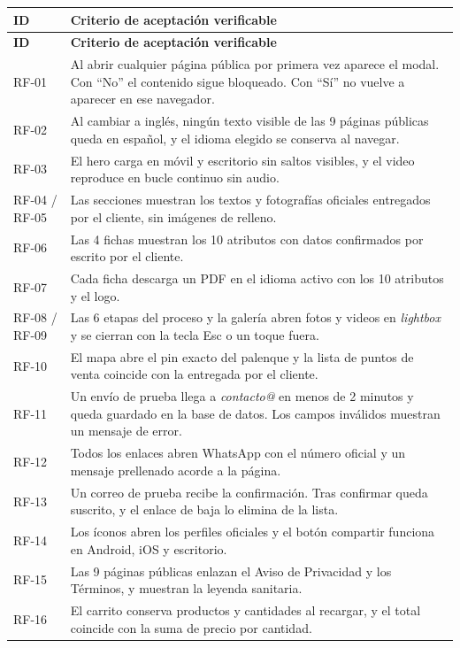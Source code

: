 \documentclass[11pt,letterpaper]{article}
\begin{document}
\renewcommand{\arraystretch}{1.3}
\small
\begin{longtable}{@{} L{1.9cm} L{13.9cm} @{}}
\toprule
\textbf{ID} & \textbf{Criterio de aceptación verificable} \\
\midrule
\endfirsthead
\toprule
\textbf{ID} & \textbf{Criterio de aceptación verificable} \\
\midrule
\endhead
\bottomrule
\endfoot
RF-01 & Al abrir cualquier página pública por primera vez aparece el modal. Con ``No'' el contenido sigue bloqueado. Con ``Sí'' no vuelve a aparecer en ese navegador. \\
RF-02 & Al cambiar a inglés, ningún texto visible de las 9 páginas públicas queda en español, y el idioma elegido se conserva al navegar. \\
RF-03 & El hero carga en móvil y escritorio sin saltos visibles, y el video reproduce en bucle continuo sin audio. \\
RF-04 / RF-05 & Las secciones muestran los textos y fotografías oficiales entregados por el cliente, sin imágenes de relleno. \\
RF-06 & Las 4 fichas muestran los 10 atributos con datos confirmados por escrito por el cliente. \\
RF-07 & Cada ficha descarga un PDF en el idioma activo con los 10 atributos y el logo. \\
RF-08 / RF-09 & Las 6 etapas del proceso y la galería abren fotos y videos en \textit{lightbox} y se cierran con la tecla Esc o un toque fuera. \\
RF-10 & El mapa abre el pin exacto del palenque y la lista de puntos de venta coincide con la entregada por el cliente. \\
RF-11 & Un envío de prueba llega a \textit{contacto@} en menos de 2 minutos y queda guardado en la base de datos. Los campos inválidos muestran un mensaje de error. \\
RF-12 & Todos los enlaces abren WhatsApp con el número oficial y un mensaje prellenado acorde a la página. \\
RF-13 & Un correo de prueba recibe la confirmación. Tras confirmar queda suscrito, y el enlace de baja lo elimina de la lista. \\
RF-14 & Los íconos abren los perfiles oficiales y el botón compartir funciona en Android, iOS y escritorio. \\
RF-15 & Las 9 páginas públicas enlazan el Aviso de Privacidad y los Términos, y muestran la leyenda sanitaria. \\
RF-16 & El carrito conserva productos y cantidades al recargar, y el total coincide con la suma de precio por cantidad. \\

\end{longtable}
\end{document}
